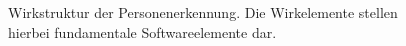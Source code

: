 \begin{figure}[H]
\begin{center}
\begin{tikzpicture}
\end{tikzpicture}
\caption{Wirkstruktur der Personenerkennung. Die Wirkelemente stellen hierbei fundamentale Softwareelemente dar.}
\label{fig: consenspers}
\end{center}
\end{figure}